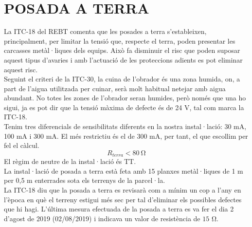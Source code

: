 \chapter{\uppercase{Posada a terra}}
La ITC-18 del REBT comenta que les posades a terra s'estableixen, principalment, per limitar la tensió que, respecte el terra, poden presentar les carcasses metàl·liques dels equips. Això fa disminuir el risc que poden suposar aquest tipus d'avaries i amb l'actuació de les proteccions adients es pot eliminar aquest risc.\\
\newline Seguint el criteri de la ITC-30, la cuina de l'obrador és una zona humida, on, a part de l'aigua utilitzada per cuinar, serà molt habitual netejar amb aigua abundant. No totes les zones de l'obrador seran humides, però només que una ho sigui, ja es pot dir que la tensió màxima de defecte és de 24 V, tal com marca la ITC-18.\\
\newline Tenim tres diferencials de sensibilitats diferents en la nostra instal·lació: 30 mA, 100 mA i 300 mA. El més restrictiu és el de 300 mA, per tant, el que escollim per fel el càlcul. 
\begin{equation}
R_{terra} < 80 \ \si{\ohm}
\end{equation}
El règim de neutre de la instal·lació és TT.\\
\newline La instal·lació de posada a terra està feta amb 15 planxes metàl·liques de 1 m per 0,5 m enterrades sota els terrenys de la parcel·la. \\
\newline La ITC-18 diu que la posada a terra es revisarà com a mínim un cop a l'any en l'època en què el terreny estigui més sec per tal d'eliminar els possibles defectes que hi hagi. L'última mesura efectuada de la posada a terra es va fer el dia 2 d'agost de 2019 (02/08/2019) i indicava un valor de resistència de $15$ \si{\ohm}.

\clearpage